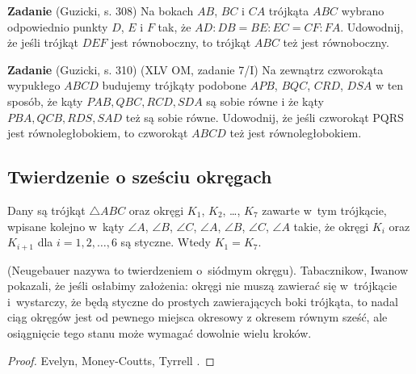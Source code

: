 \textbf{Zadanie} (Guzicki, s. 308)
Na bokach $AB$, $BC$ i $CA$ trójkąta $ABC$ wybrano odpowiednio punkty $D$, $E$ i $F$ tak, że $AD : DB = BE : EC = CF : FA$.
Udowodnij, że jeśli trójkąt $DEF$ jest równoboczny, to trójkąt $ABC$ też jest równoboczny.

\textbf{Zadanie} (Guzicki, s. 310)
(XLV OM, zadanie 7/I)
Na zewnątrz czworokąta wypukłego $ABCD$ budujemy trójkąty podobone $APB$, $BQC$, $CRD$, $DSA$ w ten sposób, że kąty $PAB, QBC, RCD, SDA$ są sobie równe i że kąty $PBA, QCB, RDS, SAD$ też są sobie równe.
Udowodnij, że jeśli czworokąt PQRS jest równoległobokiem, to czworokąt $ABCD$ też jest równoległobokiem.

%
\subsection{Twierdzenie o sześciu okręgach}

\begin{proposition}
%
    Dany są trójkąt $\triangle ABC$ oraz okręgi $K_1$, $K_2$, \ldots, $K_7$ zawarte w~tym trójkącie, wpisane kolejno w~kąty $\angle A$, $\angle B$, $\angle C$, $\angle A$, $\angle B$, $\angle C$, $\angle A$ takie, że okręgi $K_i$ oraz $K_{i+1}$ dla $i = 1, 2, \ldots, 6$ są styczne.
    Wtedy $K_1 = K_7$.
\end{proposition}

(Neugebauer \cite[s. 101]{neugebauer_2018} nazywa to twierdzeniem o~siódmym okręgu).
Tabacznikow, Iwanow \cite{ivanov_tabachnikov_2016} pokazali, że jeśli osłabimy założenia: okręgi nie muszą zawierać się w~trójkącie i~wystarczy, że będą styczne do prostych zawierających boki trójkąta, to nadal ciąg okręgów jest od pewnego miejsca okresowy z okresem równym sześć, ale osiągnięcie tego stanu może wymagać dowolnie wielu kroków.
%
%

\begin{proof}
    Evelyn, Money-Coutts, Tyrrell \cite[s. 49–58]{evelyn_money_coutts_tyrrell_1974}.
%
%
%
\end{proof}

%